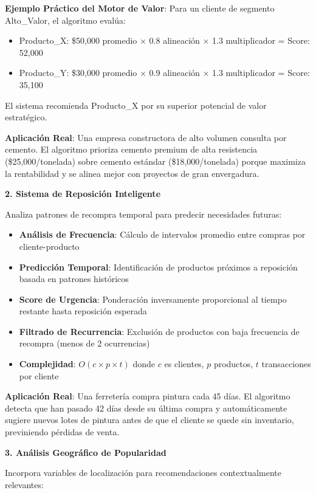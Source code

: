 \documentclass[twocolumn]{article}
\begin{document}
\textbf{Ejemplo Práctico del Motor de Valor}:
Para un cliente de segmento Alto\_Valor, el algoritmo evalúa:
\begin{itemize}
    \item Producto\_X: \$50,000 promedio × 0.8 alineación × 1.3 multiplicador = Score: 52,000
    \item Producto\_Y: \$30,000 promedio × 0.9 alineación × 1.3 multiplicador = Score: 35,100
\end{itemize}
El sistema recomienda Producto\_X por su superior potencial de valor estratégico.

\textbf{Aplicación Real}: Una empresa constructora de alto volumen consulta por cemento. El algoritmo prioriza cemento premium de alta resistencia (\$25,000/tonelada) sobre cemento estándar (\$18,000/tonelada) porque maximiza la rentabilidad y se alinea mejor con proyectos de gran envergadura.

\vspace{0.3cm}

\textbf{2. Sistema de Reposición Inteligente}

Analiza patrones de recompra temporal para predecir necesidades futuras:

\begin{itemize}
    \item \textbf{Análisis de Frecuencia}: Cálculo de intervalos promedio entre compras por cliente-producto
    \item \textbf{Predicción Temporal}: Identificación de productos próximos a reposición basada en patrones históricos
    \item \textbf{Score de Urgencia}: Ponderación inversamente proporcional al tiempo restante hasta reposición esperada
    \item \textbf{Filtrado de Recurrencia}: Exclusión de productos con baja frecuencia de recompra (menos de 2 ocurrencias)
    \item \textbf{Complejidad}: \(O(c \times p \times t)\) donde \(c\) es clientes, \(p\) productos, \(t\) transacciones por cliente
\end{itemize}

\textbf{Aplicación Real}: Una ferretería compra pintura cada 45 días. El algoritmo detecta que han pasado 42 días desde su última compra y automáticamente sugiere nuevos lotes de pintura antes de que el cliente se quede sin inventario, previniendo pérdidas de venta.

\textbf{3. Análisis Geográfico de Popularidad}

Incorpora variables de localización para recomendaciones contextualmente relevantes:
\end{document}
